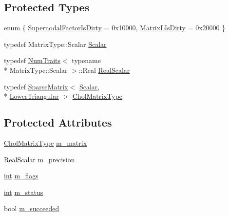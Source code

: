 \subsection*{Protected Types}
\begin{DoxyCompactItemize}
\item 
enum \{ \hyperlink{class_sparse_l_l_t_a50fce5d91eb8e231d89c5d4eef658701a8bbc2f3421ec39f84eafa0133cb33520}{Supernodal\-Factor\-Is\-Dirty} = 0x10000, 
\hyperlink{class_sparse_l_l_t_a50fce5d91eb8e231d89c5d4eef658701a4880ae3a4fb0f2dde160db51dc21545b}{Matrix\-L\-Is\-Dirty} = 0x20000
 \}
\item 
typedef Matrix\-Type\-::\-Scalar \hyperlink{class_sparse_l_l_t_acc629078ed9cd42c5d1d2c16012de3a4}{Scalar}
\item 
typedef \hyperlink{struct_num_traits}{Num\-Traits}$<$ typename \\*
Matrix\-Type\-::\-Scalar $>$\-::Real \hyperlink{class_sparse_l_l_t_a20661706ee54d830837a844d675fb236}{Real\-Scalar}
\item 
typedef \hyperlink{class_sparse_matrix}{Sparse\-Matrix}$<$ \hyperlink{class_sparse_l_l_t_acc629078ed9cd42c5d1d2c16012de3a4}{Scalar}, \\*
\hyperlink{_constants_8h_a9c6e15884c02c8075e3575670fe06894}{Lower\-Triangular} $>$ \hyperlink{class_sparse_l_l_t_a2c9d9dfe18d1e70b0f46de8c9d106bf2}{Chol\-Matrix\-Type}
\end{DoxyCompactItemize}
\subsection*{Protected Attributes}
\begin{DoxyCompactItemize}
\item 
\hyperlink{class_sparse_l_l_t_a2c9d9dfe18d1e70b0f46de8c9d106bf2}{Chol\-Matrix\-Type} \hyperlink{class_sparse_l_l_t_a243638a7dbb93ce372b011c22f6a7570}{m\-\_\-matrix}
\item 
\hyperlink{class_sparse_l_l_t_a20661706ee54d830837a844d675fb236}{Real\-Scalar} \hyperlink{class_sparse_l_l_t_a13fc8ddc2821d9c67fb9f6c43311d516}{m\-\_\-precision}
\item 
\hyperlink{ioapi_8h_a787fa3cf048117ba7123753c1e74fcd6}{int} \hyperlink{class_sparse_l_l_t_acf64c900cda7f6027ba04d05c317efa1}{m\-\_\-flags}
\item 
\hyperlink{ioapi_8h_a787fa3cf048117ba7123753c1e74fcd6}{int} \hyperlink{class_sparse_l_l_t_a4a911c19f92357888a6c3322f64b88c3}{m\-\_\-status}
\item 
bool \hyperlink{class_sparse_l_l_t_aa5580c40c743555a71d99188879d73ea}{m\-\_\-succeeded}
\end{DoxyCompactItemize}


